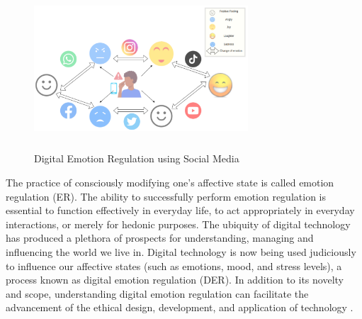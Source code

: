 \documentclass[lettersize,journal]{IEEEtran}
\begin{document}
\begin{figure}[h]
  
    \centering
    \includegraphics[width=8cm,height=6cm,keepaspectratio]{DER.pdf}
  \caption{Digital Emotion Regulation using Social Media}
  \label{fig:SMER}
  \end{figure}
The practice of consciously modifying one's affective state is called emotion regulation (ER). The ability to successfully perform emotion regulation is essential to function effectively in everyday life, to act appropriately in everyday interactions, or merely for hedonic purposes. The ubiquity of digital technology has produced a plethora of prospects for understanding, managing and influencing the world we live in. Digital technology is now being used judiciously to influence our affective states (such as emotions, mood, and stress levels), a process known as digital emotion regulation (DER). In addition to its novelty and scope, understanding digital emotion regulation can facilitate the advancement of the ethical design, development, and application of technology \cite{wadley2020digital}.
\end{document}
